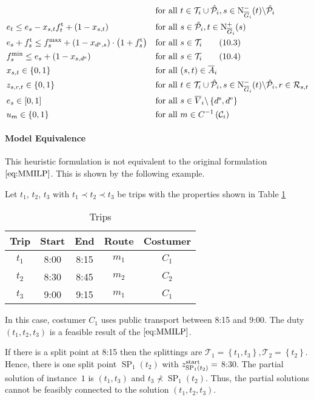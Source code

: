 \begin{align}
	& & & \text{for all } t\in\mathcal{T}_i\cup\hat{\mathcal{P}}_i, s\in\operatorname{N}_{\overline{G}_i}^-(t)\backslash\hat{\mathcal{P}}_i \\
	& e_t \leq e_s-x_{s,t}f^{\operatorname{t}}_t+\left(1-x_{s,t}\right) && \text{for all } s\in\hat{\mathcal{P}}_i,t\in\operatorname{N}_{\overline{G}_i}^+(s) \\
	& e_s + f^{\operatorname{t}}_s \leq f^{\max}_s + \left(1-x_{d^{\operatorname{s}},s}\right)\cdot\left(1+f^{\operatorname{t}}_s\right) && \text{for all } s\in\mathcal{T}_i \tag{10.3} \\
	& f^{\min}_s \leq e_s + \left(1-x_{s,d^{\operatorname{e}}}\right) && \text{for all } s\in\mathcal{T}_i \tag{10.4} \\
	& x_{s,t}\in\{0,1\} & & \text{for all } (s,t)\in\overline{A}_i \\
	& z_{s,r,t}\in\{0,1\} & & \text{for all } t\in\mathcal{T}_i\cup\hat{\mathcal{P}}_i,s\in\operatorname{N}_{\overline{G}_i}^-(t)\backslash\hat{\mathcal{P}}_i,r\in\mathcal{R}_{s,t} \\
	& e_s\in[0,1] & & \text{for all } s\in\overline{V}_i\backslash\left\{d^{\operatorname{s}},d^{\operatorname{e}}\right\} \\
	& u_m\in\{0,1\} && \text{for all } m\in C^{-1}\left(\mathcal{C}_i\right)
\end{align}

\paragraph{Model Equivalence} \parfill

This heuristic formulation is not equivalent to the original formulation $\eqref{eq:MMILP}$. This is shown by the following example.

\begin{example}

Let $t_1$, $t_2$, $t_3$ with $t_1\prec t_2\prec t_3$ be trips with the properties shown in Table \ref{tab:costumer_heuristic_example}

\begin{table}[hb]
	\centering
	\begin{tabular}{c|cccc}
		Trip & Start & End & Route & Costumer \\
		\hline
		$t_1$ & 8:00 & 8:15 & $m_1$ & $C_1$ \\
		$t_2$ & 8:30 & 8:45 & $m_2$ & $C_2$ \\
		$t_3$ & 9:00 & 9:15 & $m_1$ & $C_1$ \\
	\end{tabular}
	\caption{Trips}
	\label{tab:costumer_heuristic_example}
\end{table}

In this case, costumer $C_1$ uses public transport between 8:15 and 9:00. The duty $\left(t_1,t_2,t_3\right)$ is a feasible result of the $\eqref{eq:MMILP}$.

If there is a split point at 8:15 then the splittings are $\mathcal{T}_1=\left\{t_1,t_3\right\},\mathcal{T}_2=\left\{t_2\right\}$. Hence, there is one split point $\operatorname{SP}_1\left(t_2\right)$ with $z^{\operatorname{start}}_{\operatorname{SP}_1\left(t_2\right)} =$ 8:30. The partial solution of instance~$1$ is $\left(t_1,t_3\right)$ and $t_3\not\prec \operatorname{SP}_1\left(t_2\right)$. Thus, the partial solutions cannot be feasibly connected to the solution $\left(t_1,t_2,t_3\right)$.

\end{example}

